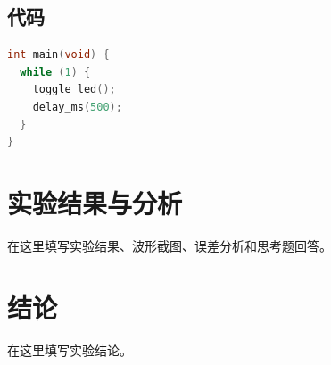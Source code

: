 \documentclass[12pt,a4paper,UTF8]{ctexart}
\begin{document}
\subsection{代码}

\begin{lstlisting}[language=C,caption={LED 闪烁示例}]
int main(void) {
  while (1) {
    toggle_led();
    delay_ms(500);
  }
}
\end{lstlisting}

\section{实验结果与分析}

在这里填写实验结果、波形截图、误差分析和思考题回答。

\section{结论}

在这里填写实验结论。

\end{document}
